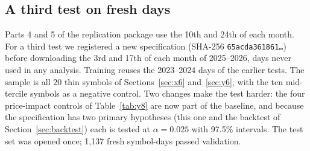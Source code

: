 \subsection{A third test on fresh days}\label{sec:z6}
Parts 4 and 5 of the replication package use the 10th and 24th of each month. For a third test we registered a new specification (SHA-256 \texttt{65acda361861\ldots}) before downloading the 3rd and 17th of each month of 2025--2026, days never used in any analysis. Training reuses the 2023--2024 days of the earlier tests. The sample is all 20 thin symbols of Sections~\ref{sec:x6} and~\ref{sec:y6}, with the ten mid-tercile symbols as a negative control. Two changes make the test harder: the four price-impact controls of Table~\ref{tab:y8} are now part of the baseline, and because the specification has two primary hypotheses (this one and the backtest of Section~\ref{sec:backtest}) each is tested at $\alpha=0.025$ with 97.5\% intervals. The test set was opened once; 1{,}137 fresh symbol-days passed validation.

